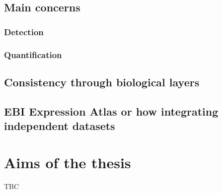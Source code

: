     \subsection{Main concerns}
        \subsubsection{Detection}
        \subsubsection{Quantification}
    \subsection{Consistency through biological layers}
    \subsection{EBI Expression Atlas or how integrating independent
    datasets }

\section{Aims of the thesis}

TBC



